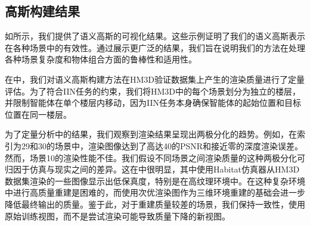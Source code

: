 \vspace{-3pt}


\subsection{高斯构建结果}



如所示，我们提供了语义高斯的可视化结果。这些示例证明了我们的语义高斯表示在各种场景中的有效性。通过展示更广泛的结果，我们旨在说明我们的方法在处理各种场景复杂度和物体组合方面的鲁棒性和适用性。

在中，我们对语义高斯构建方法在HM3D验证数据集\cite{yadav2023habitat}上产生的渲染质量进行了定量评估。为了符合IIN任务\cite{krantz2022instancespecific}的约束，我们将HM3D中的每个场景划分为独立的楼层，并限制智能体在单个楼层内移动，因为IIN任务\cite{krantz2022instancespecific}本身确保智能体的起始位置和目标位置在同一楼层。

为了定量分析中的结果，我们观察到渲染结果呈现出两极分化的趋势。例如，在索引为29和30的场景中，渲染图像达到了高达40的PSNR和接近零的深度渲染误差。然而，场景10的渲染性能不佳。我们假设不同场景之间渲染质量的这种两极分化可归因于仿真与现实之间的差异。这在中很明显，其中使用Habitat仿真器从HM3D数据集渲染的一些图像显示出低保真度，特别是在高纹理环境中。在这种复杂环境中进行高质量重建是困难的，而使用次优渲染图作为三维环境重建的基础会进一步降低最终输出的质量。鉴于此，对于重建质量较差的场景，我们保持一致性，使用原始训练视图，而不是尝试渲染可能导致质量下降的新视图。